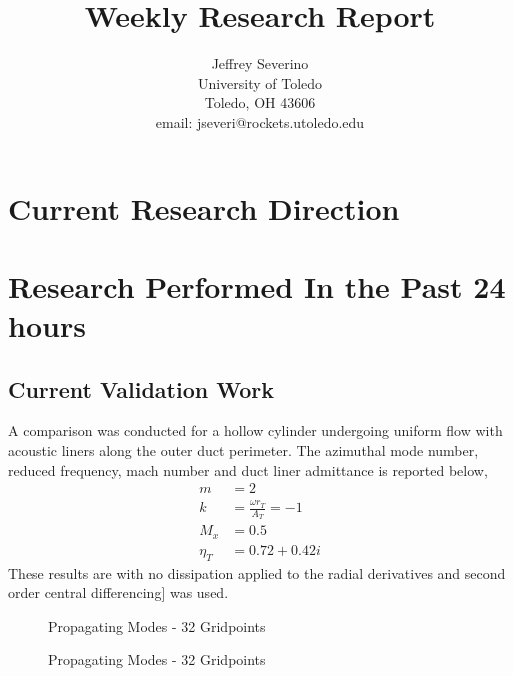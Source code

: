 \documentclass[a4paper]{article}
\begin{document}
\begin{titlepage}

    \title{
    Weekly Research Report}


    \author{ Jeffrey Severino \\
        University of Toledo \\
        Toledo, OH  43606 \\
    email: jseveri@rockets.utoledo.edu}


    \maketitle

\end{titlepage}
\section{Current Research Direction}
\section{Research Performed In the Past 24 hours}

\subsection{Current Validation Work}

A comparison was conducted for a hollow cylinder undergoing uniform flow with
acoustic liners along the outer duct perimeter. The azimuthal mode number, reduced 
frequency, mach number and duct liner admittance is reported below,
\begin{align*}
    m &= 2 \\
    k &= \frac{\omega r_T}{A_T} = -1 \\
    M_x &= 0.5 \\
    \eta_T &= 0.72 + 0.42i
\end{align*} 
These results are with no dissipation applied to the radial derivatives and 
second order central differencing] was used.
\begin{figure}
    \centering
    
    \caption{Propagating Modes - 32 Gridpoints}
\end{figure}

\begin{figure}
    \centering
    
    \caption{Propagating Modes - 32 Gridpoints}
\end{figure}
\end{document}
